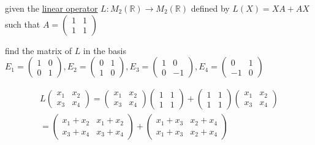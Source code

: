 \documentclass[a4paper,12pt]{article}
\begin{document}
\begin{definition}
\begin{question}
given the \hyperref[sec:orgdf3d063]{linear operator} \(L: M_2(\mathbb{R}) \to M_2(\mathbb{R})\) defined by \(L(X) = XA + AX\) such that \(A = \begin{pmatrix} 1 & 1\\ 1 & 1 \end{pmatrix}\)\\
\begin{subquestion}
find the matrix of \(L\) in the basis \(E_1=\begin{pmatrix} 1 & 0\\ 0 & 1 \end{pmatrix}, E_2=\begin{pmatrix} 0 & 1\\ 1 & 0 \end{pmatrix},E_3 = \begin{pmatrix} 1 & 0\\ 0 & -1 \end{pmatrix}, E_4 = \begin{pmatrix} 0 & 1\\ -1 & 0 \end{pmatrix}\)\\
\begin{answer}
\begin{gather*}
  L\begin{pmatrix} x_1 & x_2\\ x_3 & x_4 \end{pmatrix} = \begin{pmatrix} x_1 & x_2\\ x_3 & x_4 \end{pmatrix} \begin{pmatrix} 1 & 1\\ 1 & 1 \end{pmatrix} + \begin{pmatrix} 1 & 1\\ 1 & 1 \end{pmatrix} \begin{pmatrix} x_1 & x_2\\ x_3 & x_4 \end{pmatrix}\\
  = \begin{pmatrix} x_1+x_2 & x_1+x_2\\ x_3+x_4 & x_3+x_4 \end{pmatrix} + \begin{pmatrix} x_1+x_3 & x_2+x_4\\ x_1+x_3 & x_2+x_4 \end{pmatrix}\\

\end{gather*}
\end{answer}
\end{subquestion}
\end{question}
\end{definition}
\end{document}
